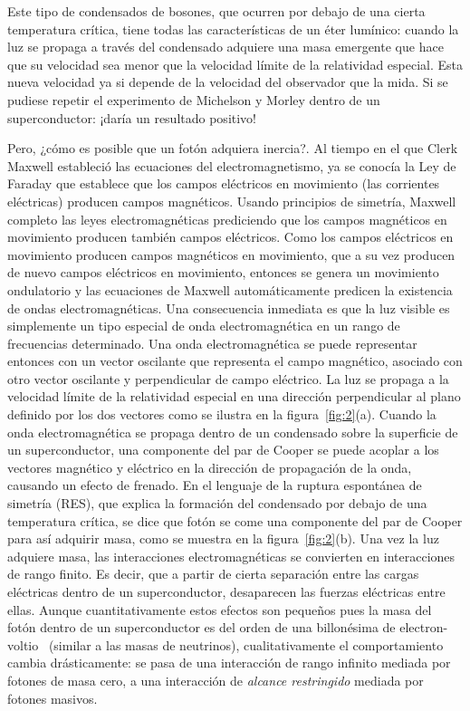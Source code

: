 Este tipo de condensados de bosones, que ocurren por debajo de una cierta temperatura crítica, tiene todas las características de un éter lumínico: cuando la luz se propaga a través del condensado adquiere una masa emergente que hace que su velocidad sea menor que la velocidad límite de la relatividad especial. Esta nueva velocidad ya si depende de la velocidad del observador que la mida. Si se pudiese repetir el experimento de Michelson y Morley dentro de un superconductor: ¡daría un resultado positivo!

Pero, ¿cómo es posible que un fotón adquiera inercia?. Al tiempo en el que Clerk Maxwell estableció las ecuaciones del electromagnetismo, ya se conocía la Ley de Faraday que establece que los campos eléctricos en movimiento (las corrientes eléctricas) producen campos magnéticos. Usando principios de simetría, Maxwell completo las leyes electromagnéticas prediciendo que los campos magnéticos en movimiento producen también campos eléctricos. Como los campos eléctricos en movimiento producen campos magnéticos en movimiento, que a su vez producen de nuevo campos eléctricos en movimiento, entonces se genera un movimiento ondulatorio y las ecuaciones de Maxwell automáticamente predicen la existencia de ondas electromagnéticas. Una consecuencia inmediata es que la luz visible es simplemente un tipo especial de onda electromagnética en un rango de frecuencias determinado. Una onda electromagnética se puede representar entonces con un vector oscilante que representa el campo magnético, asociado con otro vector oscilante y perpendicular de campo eléctrico. La luz se propaga a la velocidad límite de la relatividad especial en una dirección perpendicular al plano definido por los dos vectores como se ilustra en la figura~\ref{fig:2}(a). Cuando la onda electromagnética se propaga dentro de un condensado sobre la superficie de un superconductor, una componente del par de Cooper se puede acoplar a los vectores magnético y eléctrico en la dirección de propagación de la onda, causando un efecto de frenado. En el lenguaje de la ruptura espontánea de simetría (RES), que explica la formación del condensado por debajo de una temperatura crítica, se dice que fotón se come una componente del par de Cooper para así adquirir masa, como se muestra en la figura~\ref{fig:2}(b). Una vez la luz adquiere masa, las interacciones electromagnéticas se convierten en interacciones de rango finito. Es decir, que a partir de cierta separación entre las cargas eléctricas dentro de un superconductor, desaparecen las fuerzas eléctricas entre ellas. Aunque cuantitativamente estos efectos son pequeños pues la masa del fotón dentro de un superconductor es del orden de una billonésima de electron-voltio~\cite{beamline} (similar a las masas de neutrinos), cualitativamente el comportamiento cambia drásticamente: se pasa de una interacción de rango infinito mediada por fotones de masa cero, a una interacción de \emph{alcance restringido} mediada por fotones masivos. 


